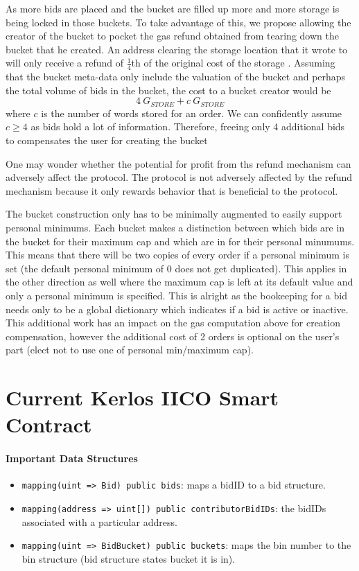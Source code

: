 \documentclass{article}
\begin{document}
As more bids are placed and the bucket are filled up more and more storage is being locked in those buckets.
To take advantage of this, we propose allowing the creator of the bucket to pocket the gas refund obtained from tearing down the bucket that he created.
An address clearing the storage location that it wrote to will only receive a refund of $\frac{1}{4}$th of the original cost of the storage \cite{yellowpaper}.
Assuming that the bucket meta-data only include the valuation of the bucket and perhaps the total volume of bids in the bucket, the cost to a bucket creator would be
\[ 4~ G_{STORE} + c~ G_{STORE} \]
where $c$ is the number of words stored for an order.
We can confidently assume $c \geq 4$ as bids hold a lot of information.
Therefore, freeing only 4 additional bids to compensates the user for creating the bucket

One may wonder whether the potential for profit from ths refund mechanism can adversely affect the protocol.
The protocol is not adversely affected by the refund mechanism because it only rewards behavior that is beneficial to the protocol.

The bucket construction only has to be minimally augmented to easily support personal minimums.
Each bucket makes a distinction between which bids are in the bucket for their maximum cap and which are in for their personal minumums.
This means that there will be two copies of every order if a personal minimum is set (the default personal minimum of 0 does not get duplicated).
This applies in the other direction as well where the maximum cap is left at its default value and only a personal minimum is specified.
This is alright as the bookeeping for a bid needs only to be a global dictionary which indicates if a bid is active or inactive. 
This additional work has an impact on the gas computation above for creation compensation, however the additional cost of 2 orders is optional on the user's part (elect not to use one of personal min/maximum cap).


\section{Current Kerlos IICO Smart Contract}
\paragraph{Important Data Structures}
\begin{itemize}
    \item \texttt{mapping(uint => Bid) public bids}: maps a bidID to a bid structure.
    \item \texttt{mapping(address => uint[]) public contributorBidIDs}: the bidIDs associated with a particular address. 
    \item {\color{red} \texttt{mapping(uint => BidBucket) public buckets}: maps the bin number to the bin structure (bid structure states bucket it is in)}.
\end{itemize}
\end{document}
